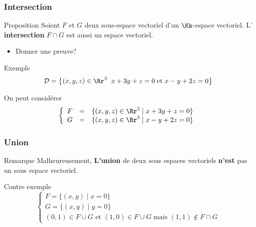 \documentclass[dvipsnames]{beamer}
\begin{document}
\begin{frame}[t]
  \frametitle{Intersection}
  \begin{block}{Proposition}
    \small
    Soient $F$ et $G$ deux sous-espace vectoriel d'un $\Kk$-espace
    vectoriel. L' \textbf{intersection} \alert{$F\cap G$} est aussi un espace
    vectoriel.
  \end{block}

  \begin{itemize}
    \item Donner une preuve?
  \end{itemize}

      \begin{block}{Exemple}
      \scriptsize
      $$
        \mathcal{D}=\left\{(x,y,z)\in\Rr^3\;\; x+3y+z=0\;\text{et}\;
        x-y+2z=0\right\}$$ 
      \end{block}
\scriptsize
      On peut considérer 
$$
\left\{
\begin{array}{lll}
  F&=&\{(x,y,z)\in\Rr^3\;|\; x+3y+z=0\}\\
  G&=&\{(x,y,z)\in\Rr^3\;|\; x-y+2z=0\}
\end{array}
\right.
$$
\end{frame}
\begin{frame}[t]
  \frametitle{Union}
  
  \begin{block}{Remarque}
    \small
    Malheureusement, \textbf{L'union}  de deux sous espaces vectoriels
    \textbf{\alert{n'est}} pas un sous espace vectoriel. 
  \end{block}

  \begin{block}{Contre exemple}
    \small
    \begin{equation*}
      \left\{\begin{array}{l}
          F = \{(x,y)\;|\; x=0\}\\[6pt]
          G = \{(x,y)\;|\; y=0\}\\[6pt]
          (0,1)\in F\cup G\text{ et  } (1,0)\in F\cup G \;\text{mais } (1,1) \notin
          F\cap G
      \end{array}\right.
    \end{equation*}
  \end{block}

  \begin{center}
\end{center} 
\end{frame}
\end{document}
